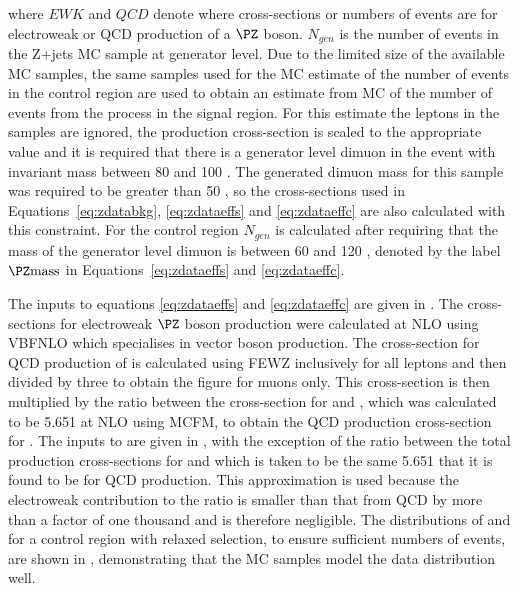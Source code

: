 where $EWK$ and $QCD$ denote where cross-sections or numbers of events are for electroweak or \ac{QCD} production of a $\PZ$ boson. $N_{gen}$ is the number of events in the Z+jets \ac{MC} sample at generator level. Due to the limited size of the available \Znunu \ac{MC} samples, the same \Zmumu samples used for the \ac{MC} estimate of the number of events in the control region are used to obtain an estimate from \ac{MC} of the number of events from the \Znunu process in the signal region. For this estimate the leptons in the \Zmumu samples are ignored, the production cross-section is scaled to the appropriate \Znunu value and it is required that there is a generator level dimuon in the event with invariant mass between 80 and 100 \GeV. The generated dimuon mass for this sample was required to be greater than 50 \GeV, so the cross-sections used in Equations~\ref{eq:zdatabkg}, \ref{eq:zdataeffs} and \ref{eq:zdataeffc} are also calculated with this constraint. For the control region $N_{gen}$ is calculated after requiring that the mass of the generator level dimuon is between 60 and 120 \GeV, denoted by the label $\PZ \rm{mass}$ in Equations~\ref{eq:zdataeffs} and \ref{eq:zdataeffc}.


The inputs to equations \ref{eq:zdataeffs} and \ref{eq:zdataeffc} are given in . The cross-sections for electroweak $\PZ$ boson production were calculated at \ac{NLO} using \textsc{VBFNLO} which specialises in vector boson production. The cross-section for \ac{QCD} production of \Zmumu is calculated using \textsc{FEWZ} inclusively for all leptons and then divided by three to obtain the figure for muons only. This cross-section is then multiplied by the ratio between the cross-section for \Znunu and \Zmumu, which was calculated to be 5.651 at \ac{NLO} using \textsc{MCFM}, to obtain the \ac{QCD} production cross-section for \Znunu. The inputs to  are given in , with the exception of the ratio between the total production cross-sections for \Znunu and \Zmumu which is taken to be the same 5.651 that it is found to be for \ac{QCD} production. This approximation is used because the electroweak contribution to the ratio is smaller than that from \ac{QCD} by more than a factor of one thousand and is therefore negligible. The distributions of \METnoMU and \Mjj for a \PZ control region with relaxed selection, to ensure sufficient numbers of events, are shown in , demonstrating that the \ac{MC} samples model the data distribution well.

